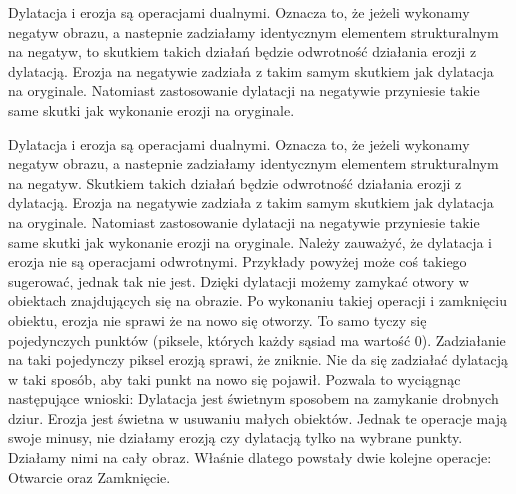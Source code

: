 \documentclass{article}
\begin{document}
        {
            \Large
            \justifying
            \quad
            Dylatacja i erozja są operacjami dualnymi.
            Oznacza to, że jeżeli wykonamy negatyw obrazu, a nastepnie zadziałamy identycznym elementem strukturalnym na negatyw, to skutkiem takich działań będzie odwrotność działania erozji z dylatacją.
            Erozja na negatywie zadziała z takim samym skutkiem jak dylatacja na oryginale.
            Natomiast zastosowanie dylatacji na negatywie przyniesie takie same skutki jak wykonanie erozji na oryginale.
        }

        \vspace{1cm}

        {
            \Large
            \justifying
            \quad
            Dylatacja i erozja są operacjami dualnymi.
            Oznacza to, że jeżeli wykonamy negatyw obrazu, a nastepnie zadziałamy identycznym elementem strukturalnym na negatyw.
            Skutkiem takich działań będzie odwrotność działania erozji z dylatacją.
            Erozja na negatywie zadziała z takim samym skutkiem jak dylatacja na oryginale.
            Natomiast zastosowanie dylatacji na negatywie przyniesie takie same skutki jak wykonanie erozji na oryginale.
            Należy zauważyć, że dylatacja i erozja nie są operacjami odwrotnymi.
            Przykłady powyżej może coś takiego sugerować, jednak tak nie jest.
            Dzięki dylatacji możemy zamykać otwory w obiektach znajdujących się na obrazie.
            Po wykonaniu takiej operacji i zamknięciu obiektu, erozja nie sprawi że na nowo się otworzy.
            To samo tyczy się pojedynczych punktów (piksele, których każdy sąsiad ma wartość 0).
            Zadziałanie na taki pojedynczy piksel erozją sprawi, że zniknie.
            Nie da się zadziałać dylatacją w taki sposób, aby taki punkt na nowo się pojawił.
            Pozwala to wyciągnąc następujące wnioski:
            Dylatacja jest świetnym sposobem na zamykanie drobnych dziur.
            Erozja jest świetna w usuwaniu małych obiektów.
            Jednak te operacje mają swoje minusy, nie działamy erozją czy dylatacją tylko na wybrane punkty.
            Działamy nimi na cały obraz.
            Właśnie dlatego powstały dwie kolejne operacje: Otwarcie oraz Zamknięcie.
        }
\end{document}
